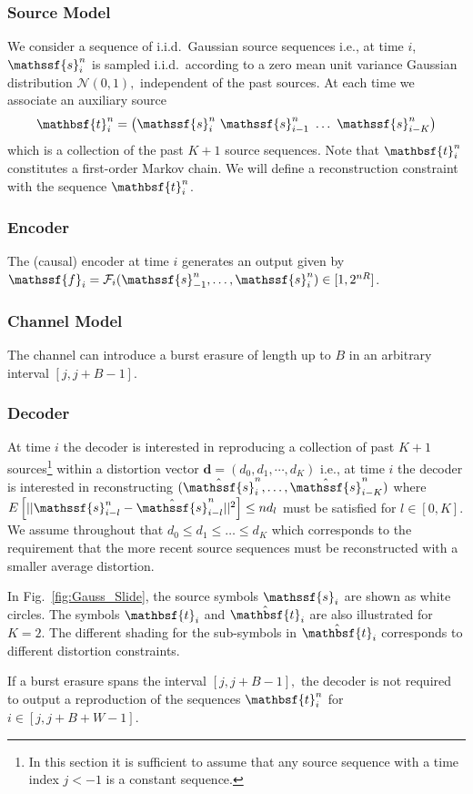\documentclass[journal, twocolumn, 10pt]{IEEEtran}
\newcommand{\bd}{{\mathbf{d}}}
\newcommand{\cF}{{\mathcal{F}}}
\newcommand{\cN}{{\mathcal{N}}}
\newcommand{\rvf}{{\mathssf{f}}}    %
\newcommand{\rvs}{{\mathssf{s}}}    %
\newcommand{\rvbt}{{\mathbsf{t}}}
\begin{document}
{\subsubsection{Source Model}
We consider a sequence of i.i.d.\ Gaussian source sequences i.e., at time $i$, $\rvs^n_{i}$ is sampled i.i.d.\ 
according to a zero mean unit variance Gaussian distribution $\cN(0,1),$ independent of the past sources. At each time we associate an auxiliary source
\begin{align}
\rvbt^n_{i}=\begin{pmatrix}
\rvs^n_{i}~
\rvs^n_{i-1}~\ldots~
\rvs^n_{i-K}\end{pmatrix}
\label{Gauss-model}
\end{align}
which is a collection of the past ${K+1}$ source sequences. Note that $\rvbt_i^n$ constitutes a first-order Markov chain. We will define a reconstruction constraint with the sequence $\rvbt_i^n$.

\subsubsection{Encoder}
The (causal) encoder at time $i$ generates an output given by 
$\rvf_{i} = \cF_i(\rvs_{-1}^n, \ldots, \rvs_i^n) \in [1,2^{nR}]$. 

\subsubsection{Channel Model}
The channel can introduce a burst  erasure of length up to $B$ in an arbitrary interval $[j, j+B-1]$.

\subsubsection{Decoder}
At time $i$ the decoder is interested in reproducing a collection of past $K+1$ sources\footnote{In this section it is sufficient to assume that any source sequence with a time index $j < -1$ is a constant sequence.}
within a distortion vector $\bd=(d_0,d_1,\cdots,d_K)$ i.e., at time $i$ the decoder is interested in reconstructing $(\hat{\rvs}_i^n,\ldots, \hat{\rvs}_{i-K}^n)$ where $E\left[||\rvs_{i-l}^n- \hat{\rvs}_{i-l}^n||^2\right] \le nd_l$ must be satisfied for $l\in[0,K]$.
We assume throughout that $d_0\le d_1\le \ldots \le d_K$ which corresponds to the requirement that the  more recent source sequences must be reconstructed with a smaller average distortion.

In Fig.~\ref{fig:Gauss_Slide}, the source symbols $\rvs_i$ are shown as white circles. The symbols $\rvbt_{i}$ and  $\hat{\rvbt}_i$ are also illustrated for $K=2$. The different shading for the sub-symbols in $\hat{\rvbt}_i$  corresponds to different distortion constraints.

If a burst erasure spans the interval $[j, j+B-1],$  the decoder is not required to output a reproduction of the sequences $\rvbt_i^n$ for $i \in [j, j+B+W-1]$.
}
\end{document}
